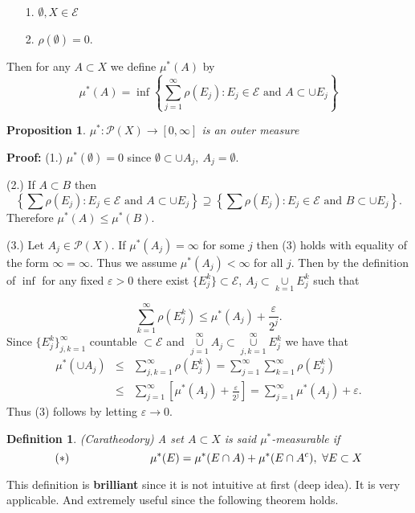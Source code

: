 \documentclass[12pt]{report}
\newtheorem{prop}[theorem]{Proposition}
\newtheorem{definition}[theorem]{Definition}
\begin{document}
\begin{itemize}
\item[1.] $\emptyset, X \in \mathcal{E}$
\item[2.]  $\rho (\emptyset) = 0.$
\end{itemize} Then for any $A \subset X$ we define $\mu^* (A)$ by
\[
\mu^*(A) = \inf \left \{\sum^\infty_{j=1} \rho(E_j):  E_j \in \mathcal{E}
\mbox{ and } A \subset \cup E_j\right \}
\]

\begin{prop} $\mu^*: \mathcal{P}(X) \longrightarrow [0,
\infty]$ is an outer measure
\end{prop} {\bf Proof:}   (1.)  $\mu^* (\emptyset) = 0$ since $\emptyset
\subset \cup A_j, \ A_j =
\emptyset$.

\smallskip
\noindent
 (2.) If $A \subset B$ then
\[
\left \{ \sum \rho(E_j): E_j \in \mathcal{E} \mbox{ and } A \subset \cup E_j
\right \}
\supseteq
\left \{ \sum \rho(E_j): E_j \in \mathcal{E} \mbox{ and } B \subset \cup E_j
\right \}.
\] Therefore $\mu^*(A) \le \mu^*(B)$.

\smallskip
\noindent
 (3.) Let $A_j \in \mathcal{P}(X)$.  If $\mu^*(A_j) = \infty$ for some $j$
then (3) holds with equality of the form $\infty = \infty$.  Thus we assume
$\mu^*(A_j) <
\infty$ for all $j$.  Then by the definition of $\inf$ for any fixed 
$\varepsilon>0$ there exist
$\{E_j^k\} \subset \mathcal{E}$,  
$A_j\subset{\underset{k=1}{\cup}}  E_j^k $  such that

\[
\sum^\infty_{k=1} \rho(E_j^k) \le \mu^* (A_j) + \frac{\varepsilon}{2^j}.
\] Since $\{E^k_j\}^\infty_{j, k=1} $ countable $\subset \mathcal{E}$ and 
$\overset{\infty}{\underset{j=1}{\cup}} A_j \subset
\overset{\infty}{\underset{j, k=1}{\cup}}  E^k_j $ we have that 
\begin{eqnarray*}
\mu^*(\cup A_j) &\le & \sum^\infty_{j, k =1} \rho(E_j^k) =
\sum^\infty_{j=1}
\sum^\infty_{k =1} \rho(E^k_j)\\ &\le & \sum^\infty_{j=1} \left [ \mu^*
(A_j) + \frac{\varepsilon}{2^j} \right ] =
\sum^\infty_{j=1} \mu^*(A_j) + \varepsilon.
\end{eqnarray*} Thus (3) follows by letting $\varepsilon \longrightarrow
0$.

\begin{definition} (Caratheodory)  A set $A \subset X$ is said
$\mu^*$-measurable if
\[ (\ast) \hskip 1. in\mu^* (E) = \mu^*(E \cap A) + \mu^*(E \cap A^c), \
\forall E
\subset X
\]
\end{definition} This definition is {\bf brilliant} since it is not intuitive
at first (deep idea). It is very applicable. And extremely useful since the  
following theorem holds.
\end{document}
